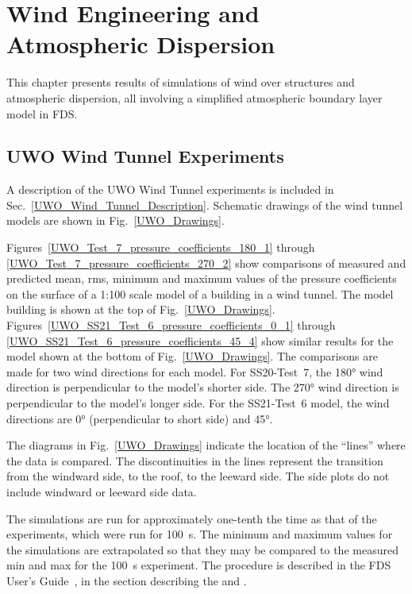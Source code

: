 
\chapter{Wind Engineering and Atmospheric Dispersion}

This chapter presents results of simulations of wind over structures and atmospheric dispersion, all involving a simplified atmospheric boundary layer model in FDS.


\section{UWO Wind Tunnel Experiments}

A description of the UWO Wind Tunnel experiments is included in Sec.~\ref{UWO_Wind_Tunnel_Description}. Schematic drawings of the wind tunnel models are shown in Fig.~\ref{UWO_Drawings}.

Figures~\ref{UWO_Test_7_pressure_coefficients_180_1} through \ref{UWO_Test_7_pressure_coefficients_270_2} show comparisons of measured and predicted mean, rms, minimum and maximum values of the pressure coefficients on the surface of a 1:100 scale model of a building in a wind tunnel. The model building is shown at the top of Fig.~\ref{UWO_Drawings}. Figures~\ref{UWO_SS21_Test_6_pressure_coefficients_0_1} through \ref{UWO_SS21_Test_6_pressure_coefficients_45_4} show similar results for the model shown at the bottom of Fig.~\ref{UWO_Drawings}. The comparisons are made for two wind directions for each model. For SS20-Test~7, the 180\unit{\degree} wind direction is perpendicular to the model's shorter side. The 270\unit{\degree} wind direction is perpendicular to the model's longer side. For the SS21-Test~6 model, the wind directions are 0\unit{\degree} (perpendicular to short side) and 45\unit{\degree}.

The diagrams in Fig.~\ref{UWO_Drawings} indicate the location of the ``lines'' where the data is compared. The discontinuities in the lines represent the transition from the windward side, to the roof, to the leeward side. The side plots do not include windward or leeward side data.

The simulations are run for approximately one-tenth the time as that of the experiments, which were run for 100~s. The minimum and maximum values for the simulations are extrapolated so that they may be compared to the measured min and max for the 100~s experiment. The procedure is described in the FDS User's Guide~\cite{FDS_Users_Guide}, in the section describing the   and .

